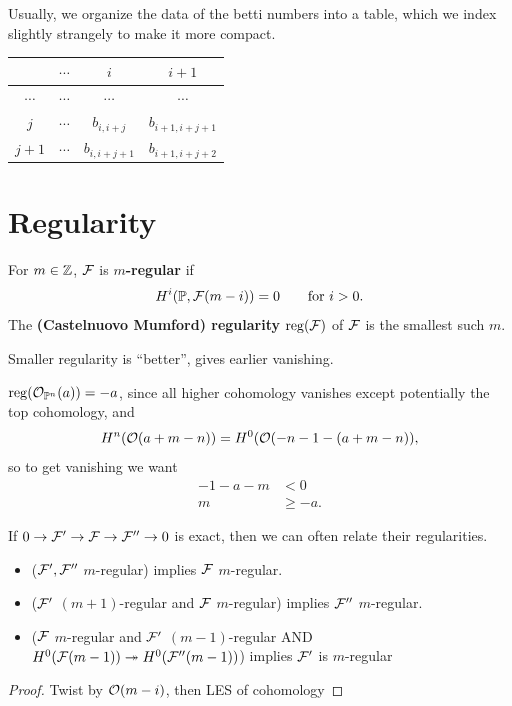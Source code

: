 \documentclass[12pt]{article}
\begin{document}
\begin{defn}
    Usually, we organize the data of the betti numbers into a table, which we index slightly strangely to make it more compact.
    \begin{center}
    \begin{tabular}{c|c c c}
                 & $\cdots$      & $i$      & $i+1$ \\\hline
        $\cdots$ & $\cdots$ & $\cdots$      & $\cdots$ \\
        $j$      & $\cdots$ & $b_{i,i+j}$   & $b_{i+1,i+j+1}$\\
        $j+1$    & $\cdots$ & $b_{i,i+j+1}$ & $b_{i+1,i+j+2}$
    \end{tabular}
    \end{center}
\end{defn}

\section{Regularity}

\begin{defn}
    For $m\in \mathbb{Z}$, $\mathcal{F}$ is \textbf{$m$-regular} if
    \[H^i(\mathbb{P},\mathcal{F}(m-i))=0 \qquad \text{for $i>0$}.\]
    The \textbf{(Castelnuovo Mumford) regularity} $\mathrm{reg}(\mathcal{F})$ of $\mathcal{F}$ is the smallest such $m$.
\end{defn}

\begin{rmk}
    Smaller regularity is ``better'', gives earlier vanishing.
\end{rmk}

\begin{eg}
    $\mathrm{reg}(\mathcal{O}_{\mathbb{P}^n}(a))=-a$, since all higher cohomology vanishes except potentially the top cohomology, and
    \[H^n(\mathcal{O}(a+m-n)) = H^0(\mathcal{O}(-n-1-(a+m-n)),\]
    so to get vanishing we want
    \begin{align*}
        -1-a-m &< 0\\
        m &\geq -a.
    \end{align*}
\end{eg}

\begin{eg}\label{reg-in-SES}
    If $0\to \mathcal{F}' \to \mathcal{F} \to \mathcal{F}'' \to 0$ is exact, then we can often relate their regularities.
    \begin{itemize}
        \item ($\mathcal{F}',\mathcal{F}''$ $m$-regular) implies $\mathcal{F}$ $m$-regular.
        \item ($\mathcal{F}'$ $(m+1)$-regular and $\mathcal{F}$ $m$-regular) implies $\mathcal{F}''$ $m$-regular.
        \item ($\mathcal{F}$ $m$-regular and $\mathcal{F}'$ $(m-1)$-regular AND $H^0(\mathcal{F}(m-1)) \twoheadrightarrow H^0(\mathcal{F}''(m-1))$) implies $\mathcal{F}'$ is $m$-regular
    \end{itemize}
    \begin{proof}
        Twist by $\mathcal{O}(m-i)$, then LES of cohomology
    \end{proof}
\end{eg}
\end{document}
